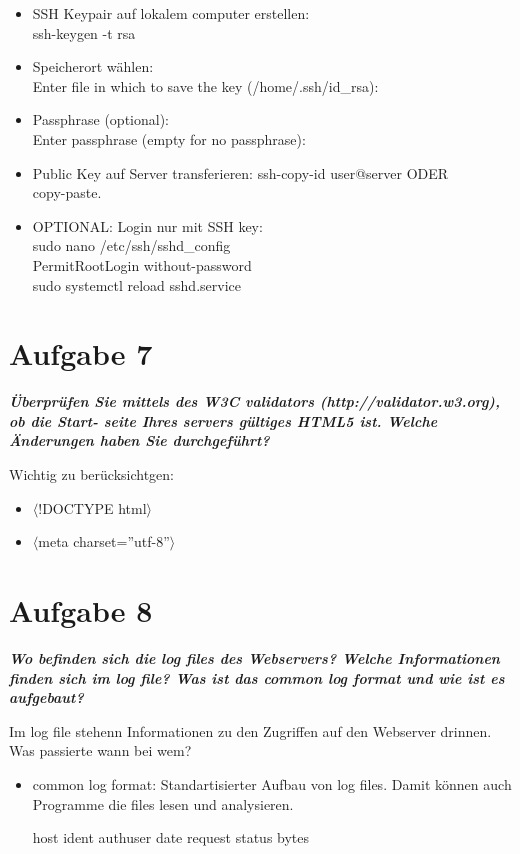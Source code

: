 \documentclass[12pt, a4paper]{report}
\begin{document}
\begin{itemize}
	\item SSH Keypair auf lokalem computer erstellen:\\
	ssh-keygen -t rsa
	\item Speicherort wählen:\\
	Enter file in which to save the key (/home/.ssh/id\_rsa):
	\item Passphrase (optional):\\
	Enter passphrase (empty for no passphrase):
	\item Public Key auf Server transferieren:
	ssh-copy-id user@server ODER \\
	copy-paste.
	\item OPTIONAL: Login nur mit SSH key:\\
	sudo nano /etc/ssh/sshd\_config\\
	PermitRootLogin without-password\\
	sudo systemctl reload sshd.service
\end{itemize}

\section*{Aufgabe 7}{\tiny }
\textbf{\textit{Überprüfen Sie mittels des W3C validators (http://validator.w3.org), ob die Start-
seite Ihres servers gültiges HTML5 ist. Welche Änderungen haben Sie durchgeführt?}}

Wichtig zu berücksichtgen:
\begin{itemize}
	\item $\langle$!DOCTYPE html$\rangle$
	\item $\langle$meta charset=''utf-8''$\rangle$
\end{itemize}

\section*{Aufgabe 8}
\textbf{\textit{Wo befinden sich die log files des Webservers? Welche Informationen finden sich im log file? Was ist das common log format und wie ist es aufgebaut?}}

Im log file stehenn Informationen zu den Zugriffen auf den Webserver drinnen. Was passierte wann bei wem?
\begin{itemize}
	\item common log format:
	Standartisierter Aufbau von log files. Damit können auch Programme die files lesen und analysieren.

	host ident authuser date request status bytes
\end{itemize}
\end{document}
